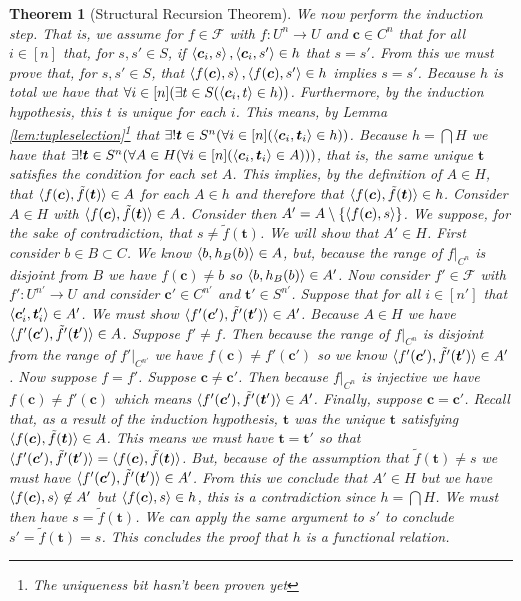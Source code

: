\documentclass[12pt]{article}
\theoremstyle{break}
\theoremstyle{break}
\newtheorem{theorem}{Theorem}[section]
\theoremstyle{break}
\theoremstyle{break}
\theoremstyle{break}
\newtheorem{informal definition}[definition]{Informal Definition}
\newcommand{\bv}[1]{\boldsymbol{#1}}
\begin{document}
\begin{theorem}[Structural Recursion Theorem]
We now perform the induction step.
That is, we assume for $f\in \mathcal{F}$ with $f:U^n \to U$ and $\bv{c}\in C^n$ that for all $i\in [n]$ that, for $s, s' \in S$,  if $\braket{\bv{c}_i, s}, \braket{\bv{c}_i, s'} \in h$ that $s=s'$.
From this we must prove that, for $s, s'\in S$, that $\braket{f(\bv{c}), s}, \braket{f(\bv{c}), s'} \in h$ implies $s=s'$.
Because $h$ is total we have that $\forall i \in [n] (\exists t\in S(\braket{\bv{c}_i, t}\in h))$.
Furthermore, by the induction hypothesis, this $t$ is unique for each $i$.
This means, by Lemma \ref{lem:tupleselection}\footnote{The uniqueness bit hasn't been proven yet} that $\exists! \bv{t}\in S^n (\forall i \in [n](\braket{\bv{c}_i, \bv{t}_i}\in h))$.
Because $h = \bigcap H$ we have that $\exists! \bv{t}\in S^n (\forall A \in H(\forall i \in [n](\braket{\bv{c}_i, \bv{t}_i} \in A)))$, that is, the same unique $\bv{t}$ satisfies the condition for each set $A$.
This implies, by the definition of $A\in H$, that $\braket{f(\bv{c}), \tilde{f}(\bv{t})} \in A$ for each $A\in h$ and therefore that $\braket{f(\bv{c}), \tilde{f}(\bv{t})}\in h$.
Consider $A\in H$ with $\braket{f(\bv{c}), \tilde{f}(\bv{t})}\in A$.
Consider then $A' = A\setminus \{\braket{f(\bv{c}), s}\}$.
We suppose, for the sake of contradiction, that $s \not = \tilde{f}(\bv{t})$.
We will show that $A' \in H$.
First consider $b\in B \subset C$.
We know $\braket{b, h_B(b)} \in A$, but, because the range of $f|_{C^n}$ is disjoint from $B$ we have $f(\bv{c}) \not = b$ so $\braket{b, h_B(b)}\in A'$.
Now consider $f'\in \mathcal{F}$ with $f':U^{n'} \to U$ and consider $\bv{c}' \in C^{n'}$ and $\bv{t}'\in S^{n'}$.
Suppose that for all $i \in [n']$ that $\braket{\bv{c}'_i, \bv{t}'_i} \in A'$.
We must show $\braket{f'(\bv{c}'), \tilde{f}'(\bv{t}')} \in A'$.
Because $A\in H$ we have $\braket{f'(\bv{c}'), \tilde{f}'(\bv{t}')} \in A$.
Suppose $f' \not = f$.
Then because the range of $f|_{C^n}$ is disjoint from the range of $f'|_{C^{n'}}$ we have $f(\bv{c}) \not = f'(\bv{c}')$ so we know $\braket{f'(\bv{c}'), \tilde{f}'(\bv{t}')} \in A'$.
Now suppose $f=f'$.
Suppose $\bv{c} \not = \bv{c}'$.
Then because $f|_{C^n}$ is injective we have $f(\bv{c}) \not = f'(\bv{c})$ which means $\braket{f'(\bv{c}'), \tilde{f}'(\bv{t}')} \in A'$.
Finally, suppose $\bv{c} = \bv{c'}$.
Recall that, as a result of the induction hypothesis, $\bv{t}$ was the unique $\bv{t}$ satisfying $\braket{f(\bv{c}), \tilde{f}(\bv{t})} \in A$.
This means we must have $\bv{t} = \bv{t}'$ so that $\braket{f'(\bv{c}'), \tilde{f}'(\bv{t}')} = \braket{f(\bv{c}), \tilde{f}(\bv{t})}$.
But, because of the assumption that $\tilde{f}(\bv{t}) \not = s$ we must have $\braket{f'(\bv{c}'), \tilde{f}'(\bv{t}')} \in A'$.
From this we conclude that $A'\in H$ but we have $\braket{f(\bv{c}), s} \not \in A'$ but $\braket{f(\bv{c}), s}\in h$, this is a contradiction since $h = \bigcap H$.
We must then have $s = \tilde{f}(\bv{t})$.
We can apply the same argument to $s'$ to conclude $s' = \tilde{f}(\bv{t}) = s$.
This concludes the proof that $h$ is a functional relation.


\end{theorem}
\end{document}
